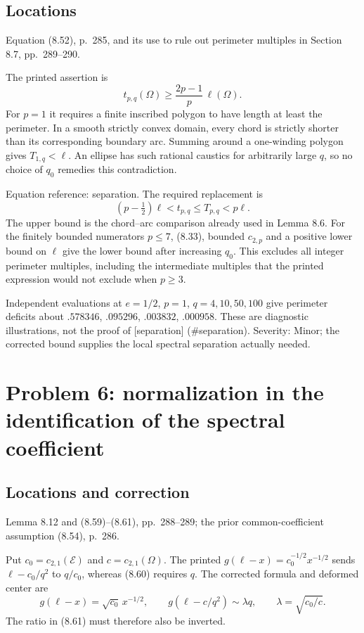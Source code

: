 \documentclass[10pt]{article}
\begin{document}
\subsection*{Locations}
Equation (8.52), p. 285, and its use to rule out perimeter multiples in Section 8.7, pp. 289–290.\par
The printed assertion is \[t_{p,q}(\Omega)\geq\frac{2p-1}{p}\,\ell(\Omega).\] For \(p=1\) it requires a finite inscribed polygon to have length at least the perimeter. In a smooth strictly convex domain, every chord is strictly shorter than its corresponding boundary arc. Summing around a one-winding polygon gives \(T_{1,q}<\ell\). An ellipse has such rational caustics for arbitrarily large \(q\), so no choice of \(q_0\) remedies this contradiction.\par
Equation reference: separation. The required replacement is \[
 (p-\tfrac12)\ell<t_{p,q}\leq T_{p,q}<p\ell.\] The upper bound is the chord–arc comparison already used in Lemma 8.6. For the finitely bounded numerators \(p\leq7\), (8.33), bounded \(c_{2,p}\) and a positive lower bound on \(\ell\) give the lower bound after increasing \(q_0\). This excludes all integer perimeter multiples, including the intermediate multiples that the printed expression would not exclude when \(p\geq3\).\par
Independent evaluations at \(e=1/2\), \(p=1\), \(q=4,10,50,100\) give perimeter deficits about \(.578346\), \(.095296\), \(.003832\), \(.000958\). These are diagnostic illustrations, not the proof of [separation] (\#separation). Severity: Minor; the corrected bound supplies the local spectral separation actually needed.\par
\section*{Problem 6: normalization in the identification of the spectral coefficient}
\subsection*{Locations and correction}
Lemma 8.12 and (8.59)–(8.61), pp. 288–289; the prior common-coefficient assumption (8.54), p. 286.\par
Put \(c_0=c_{2,1}(\mathcal E)\) and \(c=c_{2,1}(\Omega)\). The printed \(g(\ell-x)=c_0^{-1/2}x^{-1/2}\) sends \(\ell-c_0/q^2\) to \(q/c_0\), whereas (8.60) requires \(q\). The corrected formula and deformed center are \[g(\ell-x)=\sqrt{c_0}\,x^{-1/2},
 \qquad
 g(\ell-c/q^2)\sim\lambda q,\qquad
 \lambda=\sqrt{c_0/c}.\] The ratio in (8.61) must therefore also be inverted.\par
\end{document}
